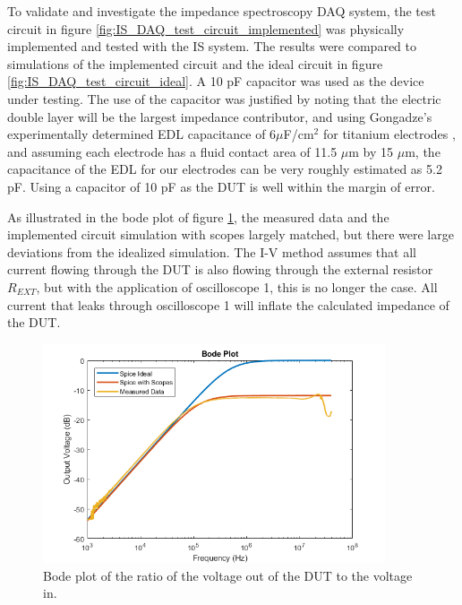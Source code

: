 \par To validate and investigate the impedance spectroscopy DAQ system, the test circuit in figure \ref{fig:IS_DAQ_test_circuit_implemented} was physically implemented and tested with the IS system. The results were compared to simulations of the implemented circuit and the ideal circuit in figure \ref{fig:IS_DAQ_test_circuit_ideal}. A 10 pF capacitor was used as the device under testing. The use of the capacitor was justified by noting that the electric double layer will be the largest impedance contributor, and using Gongadze's experimentally determined EDL capacitance of 6$\mu$F/cm$^2$ for titanium electrodes \cite{_gongadze.pdf_????}, and assuming each electrode has a fluid contact area of 11.5 $\mu$m by 15 $\mu$m, the capacitance of the EDL for our electrodes can be very roughly estimated as 5.2 pF. Using a capacitor of 10 pF as the DUT is well within the margin of error.  

\par As illustrated in the bode plot of figure \ref{fig:test_circuit_bode}, the measured data and the implemented circuit simulation with scopes largely matched, but there were large deviations from the idealized simulation. The I-V method assumes that all current flowing through the DUT is also flowing through the external resistor $R_{EXT}$, but with the application of oscilloscope 1, this is no longer the case. All current that leaks through oscilloscope 1 will inflate the calculated impedance of the DUT.  

\begin{figure}[h]
    \centering
    \includegraphics[width=0.9\textwidth]{images/spice-measured-comp.png}
    \caption{Bode plot of the ratio of the voltage out of the DUT to the voltage in.}
    \label{fig:test_circuit_bode}
\end{figure}

